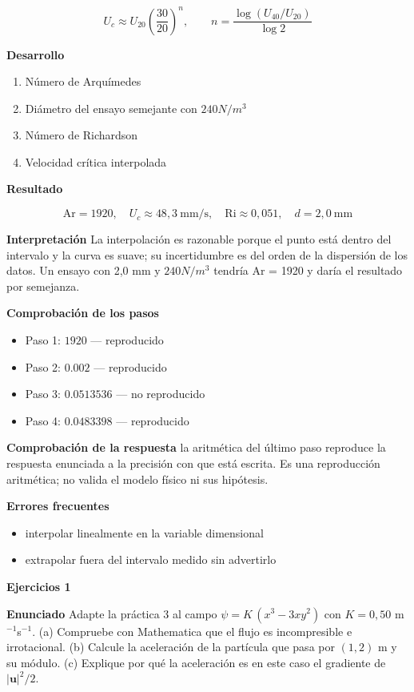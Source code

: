 \documentclass[10pt,openany]{book}
\begin{document}
\[
U_c \approx U_{20}\left(\frac{30}{20}\right)^{n},\qquad n = \frac{\log(U_{40}/U_{20})}{\log 2}
\]

\noindent\textbf{Desarrollo}
\begin{enumerate}
\item
Número de Arquímedes
\item
Diámetro del ensayo semejante con \(240 N/m^3\)
\item
Número de Richardson
\item
Velocidad crítica interpolada
\end{enumerate}

\noindent\textbf{Resultado}

\[
\mathrm{Ar} = 1920,\quad U_c \approx 48{,}3\ \mathrm{mm/s},\quad \mathrm{Ri} \approx 0{,}051,\quad d = 2{,}0\ \mathrm{mm}
\]

\noindent\textbf{Interpretación}
La interpolación es razonable porque el punto está dentro del intervalo y la curva es suave; su incertidumbre es del orden de la dispersión de los datos. Un ensayo con 2,0 mm y \(240 N/m^3\) tendría Ar = 1920 y daría el resultado por semejanza.

\noindent\textbf{Comprobación de los pasos}
\begin{itemize}
\item Paso 1: $1920$ — reproducido
\item Paso 2: $0.002$ — reproducido
\item Paso 3: $0.0513536$ — no reproducido
\item Paso 4: $0.0483398$ — reproducido
\end{itemize}

\noindent\textbf{Comprobación de la respuesta} la aritmética del último paso reproduce la respuesta enunciada a la precisión con que está escrita. Es una reproducción aritmética; no valida el modelo físico ni sus hipótesis.

\noindent\textbf{Errores frecuentes}
\begin{itemize}
\item interpolar linealmente en la variable dimensional
\item extrapolar fuera del intervalo medido sin advertirlo
\end{itemize}

\noindent\textbf{Ejercicios 1}

\noindent\textbf{Enunciado}
Adapte la práctica 3 al campo \(\psi = K\,(x^{3} - 3xy^{2})\) con \(K = 0{,}50\) m\(^{-1}\)s\(^{-1}\). (a) Compruebe con Mathematica que el flujo es incompresible e irrotacional. (b) Calcule la aceleración de la partícula que pasa por \((1, 2)\) m y su módulo. (c) Explique por qué la aceleración es en este caso el gradiente de \(|\mathbf{u}|^{2}/2\).
\end{document}
